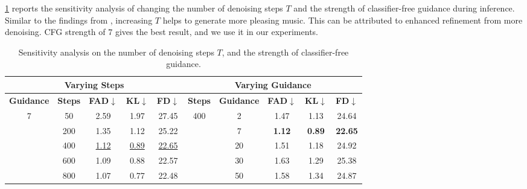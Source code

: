 \cref{tab:steps_and_guidance} reports the sensitivity analysis of changing the number of denoising steps $T$ and the strength of classifier-free guidance during inference. Similar to the findings from \citet{tango}, increasing $T$ helps to generate more pleasing music. This can be attributed to enhanced refinement from more denoising. CFG strength of $7$ gives the best result, and we use it in our experiments. 

\begin{table}
\centering
\resizebox{\columnwidth}{!}
{\begin{tabular}{c|cccc|c|cccc}
\toprule
\multicolumn{5}{c|}{\bf Varying Steps} & \multicolumn{5}{c}{ \bf Varying Guidance } \\
\midrule
\textbf{Guidance} & 
\textbf{Steps} &
\textbf{FAD}$\downarrow$ & \textbf{KL}$\downarrow$ & \textbf{FD}$\downarrow$ & \textbf{Steps} & \textbf{Guidance} & \textbf{FAD}$\downarrow$ & \textbf{KL}$\downarrow$ & \textbf{FD}$\downarrow$  \\
\midrule
\multirow{5}{*}{7}
& 50 & 2.59 & 1.97 & 27.45 & \multirow{5}{*}{400}
& 2 & 1.47 & 1.13 & 24.64 \\
& 200 & 1.35 & 1.12 & 25.22 & & 7 & \textbf{1.12} & \textbf{0.89} & \textbf{22.65} \\
& 400 & \underline{1.12} & \underline{0.89} & \underline{22.65} & & 20 & 1.51 & 1.18 & 24.92 \\
& 600 & 1.09 & 0.88 & 22.57 & & 30 & 1.63 & 1.29 & 25.38 \\
& 800 & 1.07 & 0.77 & 22.48 & & 50 & 1.58 & 1.34 & 24.87 \\
\bottomrule
\end{tabular}}
\caption{
Sensitivity analysis on the number of denoising steps $T$, and the strength of classifier-free guidance.
}
\label{tab:steps_and_guidance}
\end{table}

